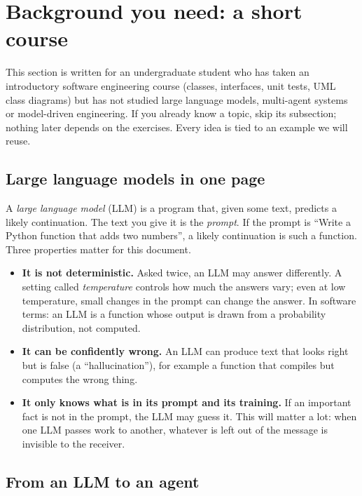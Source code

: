 \documentclass[10pt,a4paper]{article}
\begin{document}
\section{Background you need: a short course}\label{sec:course}

This section is written for an undergraduate student who has taken an
introductory software engineering course (classes, interfaces, unit tests,
UML class diagrams) but has not studied large language models, multi-agent
systems or model-driven engineering. If you already know a topic, skip its
subsection; nothing later depends on the exercises. Every idea is tied to
an example we will reuse.

\subsection{Large language models in one page}

A \emph{large language model} (LLM) is a program that, given some text,
predicts a likely continuation. The text you give it is the \emph{prompt}.
If the prompt is ``Write a Python function that adds two numbers'', a likely
continuation is such a function. Three properties matter for this document.

\begin{itemize}
\item \textbf{It is not deterministic.} Asked twice, an LLM may answer
differently. A setting called \emph{temperature} controls how much the
answers vary; even at low temperature, small changes in the prompt can change
the answer. In software terms: an LLM is a function whose output is drawn
from a probability distribution, not computed.
\item \textbf{It can be confidently wrong.} An LLM can produce text that looks
right but is false (a ``hallucination''), for example a function that
compiles but computes the wrong thing.
\item \textbf{It only knows what is in its prompt and its training.} If an
important fact is not in the prompt, the LLM may guess it. This will matter
a lot: when one LLM passes work to another, whatever is left out of the
message is invisible to the receiver.
\end{itemize}

\subsection{From an LLM to an agent}
\end{document}
